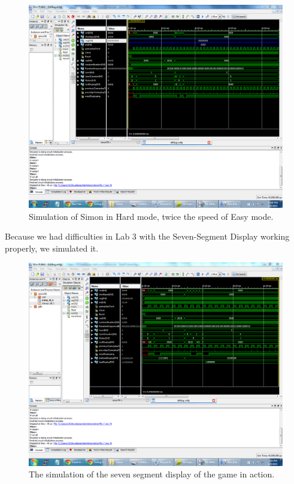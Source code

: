\documentclass[]{article}
\begin{document}
\begin{figure}[H]
\centering
\includegraphics[width=\textwidth]{HardMode.PNG}
\caption{Simulation of Simon in Hard mode, twice the speed of Easy mode.}
\label{fig:hard}
\end{figure}

Because we had difficulties in Lab 3 with the Seven-Segment Display working properly, we simulated it. \\

\begin{figure}[H]
\centering
\includegraphics[width=\textwidth]{sevensegEasy.PNG}
\caption{The simulation of the seven segment display of the game in action.}
\label{fig:sevenseg}
\end{figure}
\end{document}
